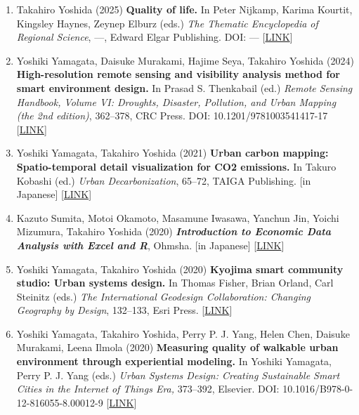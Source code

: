 \documentclass[
]{book}
\providecommand{\tightlist}{%
  \setlength{\itemsep}{0pt}\setlength{\parskip}{0pt}}
\begin{document}
\begin{enumerate}
\def\labelenumi{\arabic{enumi}.}
\tightlist
\item
  Takahiro Yoshida (2025)
  \textbf{Quality of life.}
  In Peter Nijkamp, Karima Kourtit, Kingsley Haynes, Zeynep Elburz (eds.)
  \emph{The Thematic Encyclopedia of Regional Science}, ---, Edward Elgar Publishing.
  DOI: --- {[}\href{https://www.e-elgar.com/shop/gbp/thematic-encyclopedia-of-regional-science-9781800379275.html?srsltid=AfmBOooptnm6phReAleadX5VhoN1UoLkXsyzJf9tqskct2fYabdl7h6L}{LINK}{]}
\item
  Yoshiki Yamagata, Daisuke Murakami, Hajime Seya, Takahiro Yoshida (2024)
  \textbf{High-resolution remote sensing and visibility analysis method for smart environment design.}
  In Prasad S. Thenkabail (ed.)
  \emph{Remote Sensing Handbook, Volume VI: Droughts, Disaster, Pollution, and Urban Mapping (the 2nd edition)}, 362--378, CRC Press.
  DOI: 10.1201/9781003541417-17 {[}\href{https://doi.org/10.1201/9781003541417-17}{LINK}{]}
\item
  Yoshiki Yamagata, Takahiro Yoshida (2021)
  \textbf{Urban carbon mapping: Spatio-temporal detail visualization for CO2 emissions.}
  In Takuro Kobashi (ed.)
  \emph{Urban Decarbonization}, 65--72, TAIGA Publishing.
  {[}in Japanese{]} {[}\href{https://www.taigashuppan.co.jp/products/detail/552}{LINK}{]}
\item
  Kazuto Sumita, Motoi Okamoto, Masamune Iwasawa, Yanchun Jin, Yoichi Mizumura, Takahiro Yoshida (2020)
  \textbf{\emph{Introduction to Economic Data Analysis with Excel and R}}, Ohmsha.
  {[}in Japanese{]} {[}\href{https://www.ohmsha.co.jp/book/9784274225628/}{LINK}{]}
\item
  Yoshiki Yamagata, Takahiro Yoshida (2020)
  \textbf{Kyojima smart community studio: Urban systems design.}
  In Thomas Fisher, Brian Orland, Carl Steinitz (eds.)
  \emph{The International Geodesign Collaboration: Changing Geography by Design}, 132--133, Esri Press.
  {[}\href{https://esripress.esri.com/display/index.cfm?fuseaction=display&websiteID=388&moduleID=0}{LINK}{]}
\item
  Yoshiki Yamagata, Takahiro Yoshida, Perry P. J. Yang, Helen Chen, Daisuke Murakami, Leena Ilmola (2020)
  \textbf{Measuring quality of walkable urban environment through experiential modeling.}
  In Yoshiki Yamagata, Perry P. J. Yang (eds.)
  \emph{Urban Systems Design: Creating Sustainable Smart Cities in the Internet of Things Era,} 373--392, Elsevier.
  DOI: 10.1016/B978-0-12-816055-8.00012-9 {[}\href{https://www.elsevier.com/books/urban-systems-design/yamagata/978-0-12-816055-8}{LINK}{]}

\end{enumerate}
\end{document}
